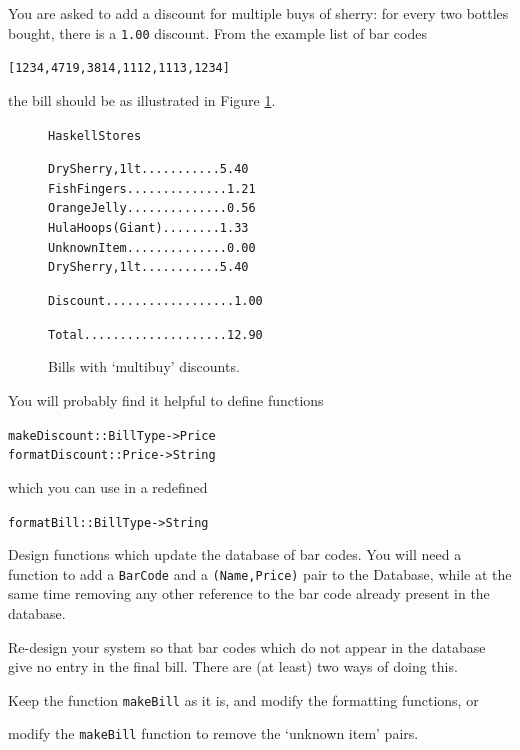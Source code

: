 \begin{exercises}
\item
You are asked to add a discount for multiple buys
of sherry: for every two bottles bought, there is a %
\texttt{1.00} discount. From the example list of bar codes
\begin{alltt}
[1234,4719,3814,1112,1113,1234]
\end{alltt}
the bill should be as illustrated in 
Figure \ref{newBill}.
\begin{figure}[t]
\begin{alltt}
                          Haskell Stores
                     
                  Dry Sherry, 1lt...........5.40
                  Fish Fingers..............1.21
                  Orange Jelly..............0.56
                  Hula Hoops (Giant)........1.33
                  Unknown Item..............0.00
                  Dry Sherry, 1lt...........5.40
                     
                  Discount..................1.00
                     
                  Total....................12.90
\end{alltt}
\caption{Bills with `multibuy' discounts.}
\label{newBill}
\end{figure}
You will probably find it helpful to define functions
\begin{alltt}
makeDiscount :: BillType -> Price
formatDiscount :: Price -> String
\end{alltt}
which you can use in a redefined
\begin{alltt}
formatBill :: BillType -> String
\end{alltt}

\item
Design functions which update the database of bar codes. You will need a
function to add a \texttt{BarCode} and a \texttt{(Name,Price)} pair to the {\mi
Database}, while at the same time removing any other reference to the bar
code already present in the database.

\item
Re-design your system so that bar codes which do not appear in the database
give no entry in the final bill. There are (at least) two ways of doing this.
\begin{titemize}
\item Keep the function \texttt{makeBill} as it is, and modify the 
formatting functions, or
\item modify the \texttt{makeBill} function to remove the `unknown item' pairs.
\end{titemize}



\end{exercises}
